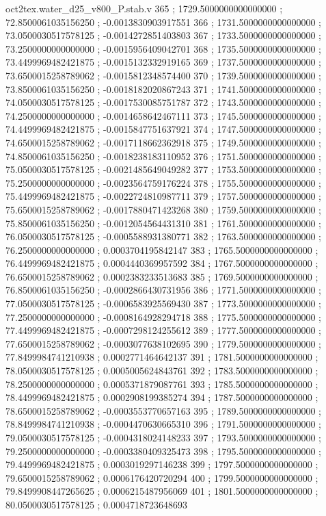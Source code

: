 \begin{filecontents}[overwrite]{oct2tex.water_d25_v800_P.stab.v}
365 ; 1729.5000000000000000 ; 72.8500061035156250 ; -0.0013830903917551
366 ; 1731.5000000000000000 ; 73.0500030517578125 ; -0.0014272851403803
367 ; 1733.5000000000000000 ; 73.2500000000000000 ; -0.0015956409042701
368 ; 1735.5000000000000000 ; 73.4499969482421875 ; -0.0015132332919165
369 ; 1737.5000000000000000 ; 73.6500015258789062 ; -0.0015812348574400
370 ; 1739.5000000000000000 ; 73.8500061035156250 ; -0.0018182020867243
371 ; 1741.5000000000000000 ; 74.0500030517578125 ; -0.0017530085751787
372 ; 1743.5000000000000000 ; 74.2500000000000000 ; -0.0014658642467111
373 ; 1745.5000000000000000 ; 74.4499969482421875 ; -0.0015847751637921
374 ; 1747.5000000000000000 ; 74.6500015258789062 ; -0.0017118662362918
375 ; 1749.5000000000000000 ; 74.8500061035156250 ; -0.0018238183110952
376 ; 1751.5000000000000000 ; 75.0500030517578125 ; -0.0021485649049282
377 ; 1753.5000000000000000 ; 75.2500000000000000 ; -0.0023564759176224
378 ; 1755.5000000000000000 ; 75.4499969482421875 ; -0.0022724810987711
379 ; 1757.5000000000000000 ; 75.6500015258789062 ; -0.0017880471423268
380 ; 1759.5000000000000000 ; 75.8500061035156250 ; -0.0012054564431310
381 ; 1761.5000000000000000 ; 76.0500030517578125 ; -0.0005588931380771
382 ; 1763.5000000000000000 ; 76.2500000000000000 ; 0.0003704195842147
383 ; 1765.5000000000000000 ; 76.4499969482421875 ; 0.0004440369957592
384 ; 1767.5000000000000000 ; 76.6500015258789062 ; 0.0002383233513683
385 ; 1769.5000000000000000 ; 76.8500061035156250 ; -0.0002866430731956
386 ; 1771.5000000000000000 ; 77.0500030517578125 ; -0.0006583925569430
387 ; 1773.5000000000000000 ; 77.2500000000000000 ; -0.0008164928294718
388 ; 1775.5000000000000000 ; 77.4499969482421875 ; -0.0007298124255612
389 ; 1777.5000000000000000 ; 77.6500015258789062 ; -0.0003077638102695
390 ; 1779.5000000000000000 ; 77.8499984741210938 ; 0.0002771464642137
391 ; 1781.5000000000000000 ; 78.0500030517578125 ; 0.0005005624843761
392 ; 1783.5000000000000000 ; 78.2500000000000000 ; 0.0005371879087761
393 ; 1785.5000000000000000 ; 78.4499969482421875 ; 0.0002908199385274
394 ; 1787.5000000000000000 ; 78.6500015258789062 ; -0.0003553770657163
395 ; 1789.5000000000000000 ; 78.8499984741210938 ; -0.0004470630665310
396 ; 1791.5000000000000000 ; 79.0500030517578125 ; -0.0004318024148233
397 ; 1793.5000000000000000 ; 79.2500000000000000 ; -0.0003380409325473
398 ; 1795.5000000000000000 ; 79.4499969482421875 ; 0.0003019297146238
399 ; 1797.5000000000000000 ; 79.6500015258789062 ; 0.0006176420720294
400 ; 1799.5000000000000000 ; 79.8499908447265625 ; 0.0006215487956069
401 ; 1801.5000000000000000 ; 80.0500030517578125 ; 0.0004718723648693

\end{filecontents}
